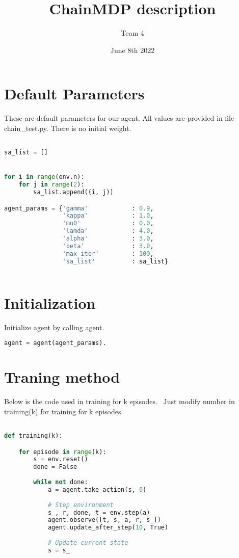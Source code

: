 \documentclass{article}
\title{ChainMDP description}
\author{Team 4}
\date{June 8th 2022}
\begin{document}
\maketitle

\section{Default Parameters}
\begin{flushleft}
These are default parameters for our agent. All values are provided in file chain\_test.py. There is no initial weight. 
\end{flushleft}
\begin{lstlisting}[language=Python]

sa_list = []


for i in range(env.n):
    for j in range(2):
        sa_list.append((i, j))

agent_params = {'gamma'            : 0.9,
                'kappa'            : 1.0,
                'mu0'              : 0.0,
                'lamda'            : 4.0,
                'alpha'            : 3.0,
                'beta'             : 3.0,
                'max_iter'         : 100,
                'sa_list'          : sa_list}
                
\end{lstlisting}

\section{Initialization}

Initialize agent by calling agent.
\begin{lstlisting}[language=Python]
agent = agent(agent_params).
\end{lstlisting}
\section{Traning method}
\begin{flushleft}
Below is the code used in training for k episodes. \ Just modify number in training(k) for training for k episodes. 
\end{flushleft}
\begin{lstlisting}[language=Python]

def training(k):

    for episode in range(k): 
        s = env.reset()
        done = False
      
        while not done:
            a = agent.take_action(s, 0)
          
            # Step environment
            s_, r, done, t = env.step(a)
            agent.observe([t, s, a, r, s_])
            agent.update_after_step(10, True)
          
            # Update current state
            s = s_
            
\end{lstlisting}




\nocite{*}
\end{document}
